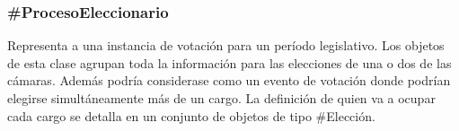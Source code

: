\subsubsection{\#ProcesoEleccionario}

Representa a una instancia de votación para un período
legislativo. Los objetos de esta clase agrupan toda la información
para las elecciones de una o dos de las cámaras. Además podría
considerase como un evento de votación donde podrían elegirse
simultáneamente más de un cargo. La definición de quien va a ocupar
cada cargo se detalla en un conjunto de objetos de tipo \#Elección.

\begin{description}
  
\end{description}
